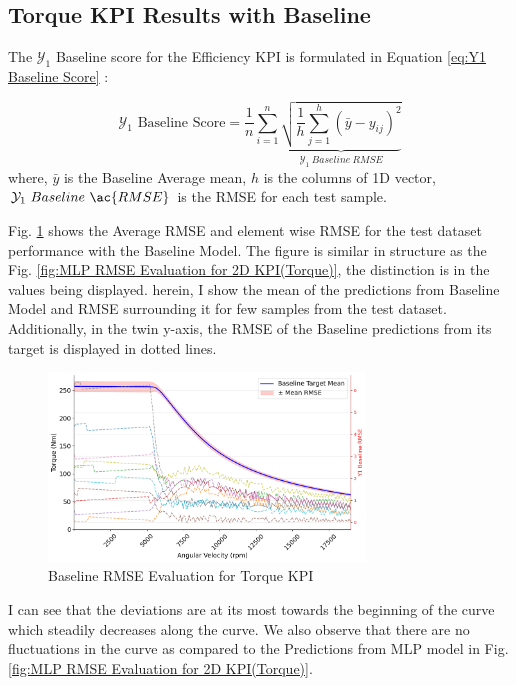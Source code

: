 \documentclass{report} %
\begin{document}
\subsection{Torque KPI Results with Baseline}\label{subsec:Torque KPI Results with Baseline}

The $\mathcal{Y}_1$ Baseline score for the Efficiency \ac{KPI} is formulated in Equation \ref{eq:Y1 Baseline Score} :

\begin{equation}
    \text{$\mathcal{Y}_1$ Baseline Score} = \frac{1}{n} \sum_{i=1}^{n} \underbrace{ \sqrt{\frac{1}{h} \sum_{j=1}^{h} (\bar{y} - y_{ij})^2}}_{\mathcal{Y}_1\ Baseline\ RMSE}
    \label{eq:Y1 Baseline Score}
\end{equation}
where, \(\bar{y}\) is the Baseline Average mean, \(h\) is the columns of 1D vector, \(\mathcal{Y}_1\ Baseline\ \ac{RMSE}\) is the \ac{RMSE} for each test sample.

Fig. \ref{fig:Baseline RMSE Evaluation for 2D KPI(Torque)} shows the Average \ac{RMSE} and element wise \ac{RMSE} for the test dataset performance with the 
Baseline Model. The figure is similar in structure as the Fig. \ref{fig:MLP RMSE Evaluation for 2D KPI(Torque)}, the distinction is in the values being displayed. 
herein, I show the mean of the predictions from Baseline Model and \ac{RMSE} surrounding it for few samples from the test dataset. Additionally, in the twin y-axis, 
the \ac{RMSE} of the Baseline predictions from its target is displayed in dotted lines.

\begin{figure}[H]
    \centering
    \includegraphics[width=0.75\textwidth]{./ReportImages/RMSE_Baseline_y1.png} 
    \caption{Baseline \ac{RMSE} Evaluation for Torque \ac{KPI}} 
    \label{fig:Baseline RMSE Evaluation for 2D KPI(Torque)}
\end{figure}

I can see that the deviations are at its most towards the beginning of the curve which steadily decreases along the curve. We also observe that there are no 
fluctuations in the curve as compared to the Predictions from \ac{MLP} model in Fig. \ref{fig:MLP RMSE Evaluation for 2D KPI(Torque)}.
\end{document}
